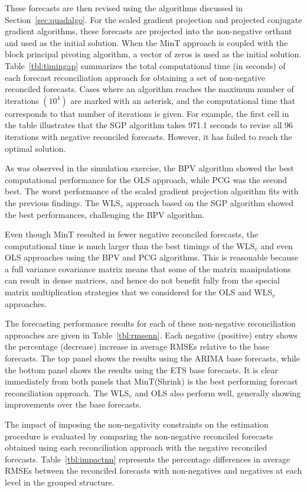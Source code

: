 \documentclass[twocolumn]{svjour3}
\begin{document}
These forecasts are then revised using the algorithms discussed in Section~\ref{sec:quadalgo}. For the scaled gradient projection and projected conjugate gradient algorithms, these forecasts are projected into the non-negative orthant and used as the initial solution. When the MinT approach is coupled with the block principal pivoting algorithm, a vector of zeros is used as the initial solution. Table~\ref{tbl:timingap} summarizes the total computational time (in seconds) of each forecast reconciliation approach for obtaining a set of non-negative reconciled forecasts. Cases where an algorithm reaches the maximum number of iterations $(10^{4})$ are marked with an asterisk, and the computational time that corresponds to that number of iterations is given. For example, the first cell in the table illustrates that the SGP algorithm takes 971.1 seconds to revise all 96 iterations with negative reconciled forecasts. However, it has failed to reach the optimal solution.

As was observed in the simulation exercise, the BPV algorithm showed the best computational performance for the OLS approach, while PCG was the second best. The worst performance of the scaled gradient projection algorithm fits with the previous findings. The WLS$_{v}$ approach based on the SGP algorithm showed the best performances, challenging the BPV algorithm.

Even though MinT resulted in fewer negative reconciled forecasts, the computational time is much larger than the best timings of the WLS$_{v}$ and even OLS approaches using the BPV and PCG algorithms. This is reasonable because a full variance covariance matrix means that some of the matrix manipulations can result in dense matrices, and hence do not benefit fully from the special matrix multiplication strategies that we considered for the OLS and WLS$_{v}$ approaches.

 
The forecasting performance results for each of these non-negative reconciliation approaches are given in Table~\ref{tbl:rmsenn}. Each negative (positive) entry shows the percentage (decrease) increase in average RMSEs relative to the base forecasts. The top panel shows the results using the ARIMA base forecasts, while the bottom panel shows the results using the ETS base forecasts. It is clear immediately from both panels that MinT(Shrink) is the best performing forecast reconciliation approach. The WLS$_v$ and OLS also perform well, generally showing improvements over the base forecasts.


The impact of imposing the non-negativity constraints on the estimation procedure is evaluated by comparing the non-negative reconciled forecasts obtained using each reconciliation approach with the negative reconciled forecasts. Table~\ref{tbl:impactnn} represents the percentage differences in average RMSEs between the reconciled forecasts with non-negatives and negatives at each level in the grouped structure.
\end{document}
